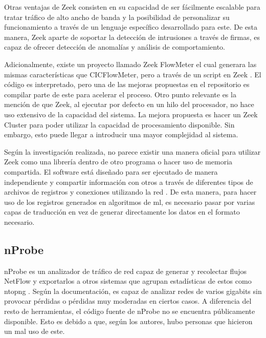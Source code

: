 Otras ventajas de Zeek consisten en su capacidad de ser fácilmente escalable para tratar tráfico de alto ancho de banda y la posibilidad de personalizar su funcionamiento a través de un lenguaje específico desarrollado para este. De esta manera, Zeek aparte de soportar la detección de intrusiones a través de firmas, es capaz de ofrecer detección de anomalías y análisis de comportamiento.

Adicionalmente, existe un proyecto llamado Zeek FlowMeter el cual generara las mismas características que CICFlowMeter, pero a través de un script en Zeek \cite{zeek_flowmeter}. El código es interpretado, pero una de las mejoras propuestas en el repositorio es compilar parte de este para acelerar el proceso. Otro punto relevante es la mención de que Zeek, al ejecutar por defecto en un hilo del procesador, no hace uso extensivo de la capacidad del sistema. La mejora propuesta es hacer un Zeek Cluster \cite{zeek_documentation_cluster} para poder utilizar la capacidad de procesamiento disponible. Sin embargo, esto puede llegar a introducir una mayor complejidad al sistema.

Según la investigación realizada, no parece existir una manera oficial para utilizar Zeek como una librería dentro de otro programa o hacer uso de memoria compartida. El software está diseñado para ser ejecutado de manera independiente y compartir información con otros a través de diferentes tipos de archivos de registros \cite{zeek_documentation_logging} y conexiones utilizando la red \cite{zeek_documentation_logwriters}. De esta manera, para hacer uso de los registros generados en algoritmos de \acrshort{ml}, es necesario pasar por varias capas de traducción en vez de generar directamente los datos en el formato necesario.

\subsection{nProbe}

nProbe es un analizador de tráfico de red capaz de generar y recolectar flujos NetFlow y exportarlos a otros sistemas que agrupan estadísticas de estos como ntopng \cite{nprobe_documentation}. Según la documentación, es capaz de analizar redes de varios gigabits sin provocar pérdidas o pérdidas muy moderadas en ciertos casos. A diferencia del resto de herramientas, el código fuente de nProbe no se encuentra públicamente disponible. Esto es debido a que, según los autores, hubo personas que hicieron un mal uso de este. 

